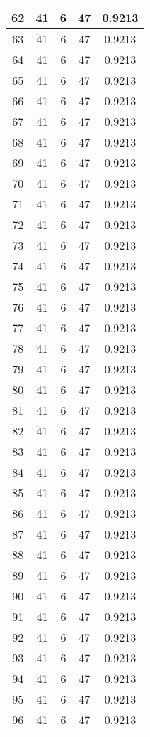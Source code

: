 \documentclass[letterpaper, 12pt]{article}
\begin{document}
\begin{longtable}{|c|c|c|c|c|}
\hline
62 & 41 & 6 & 47 & 0.9213 \\
\hline
63 & 41 & 6 & 47 & 0.9213 \\
\hline
64 & 41 & 6 & 47 & 0.9213 \\
\hline
65 & 41 & 6 & 47 & 0.9213 \\
\hline
66 & 41 & 6 & 47 & 0.9213 \\
\hline
67 & 41 & 6 & 47 & 0.9213 \\
\hline
68 & 41 & 6 & 47 & 0.9213 \\
\hline
69 & 41 & 6 & 47 & 0.9213 \\
\hline
70 & 41 & 6 & 47 & 0.9213 \\
\hline
71 & 41 & 6 & 47 & 0.9213 \\
\hline
72 & 41 & 6 & 47 & 0.9213 \\
\hline
73 & 41 & 6 & 47 & 0.9213 \\
\hline
74 & 41 & 6 & 47 & 0.9213 \\
\hline
75 & 41 & 6 & 47 & 0.9213 \\
\hline
76 & 41 & 6 & 47 & 0.9213 \\
\hline
77 & 41 & 6 & 47 & 0.9213 \\
\hline
78 & 41 & 6 & 47 & 0.9213 \\
\hline
79 & 41 & 6 & 47 & 0.9213 \\
\hline
80 & 41 & 6 & 47 & 0.9213 \\
\hline
81 & 41 & 6 & 47 & 0.9213 \\
\hline
82 & 41 & 6 & 47 & 0.9213 \\
\hline
83 & 41 & 6 & 47 & 0.9213 \\
\hline
84 & 41 & 6 & 47 & 0.9213 \\
\hline
85 & 41 & 6 & 47 & 0.9213 \\
\hline
86 & 41 & 6 & 47 & 0.9213 \\
\hline
87 & 41 & 6 & 47 & 0.9213 \\
\hline
88 & 41 & 6 & 47 & 0.9213 \\
\hline
89 & 41 & 6 & 47 & 0.9213 \\
\hline
90 & 41 & 6 & 47 & 0.9213 \\
\hline
91 & 41 & 6 & 47 & 0.9213 \\
\hline
92 & 41 & 6 & 47 & 0.9213 \\
\hline
93 & 41 & 6 & 47 & 0.9213 \\
\hline
94 & 41 & 6 & 47 & 0.9213 \\
\hline
95 & 41 & 6 & 47 & 0.9213 \\
\hline
96 & 41 & 6 & 47 & 0.9213 \\

\end{longtable}
\end{document}
